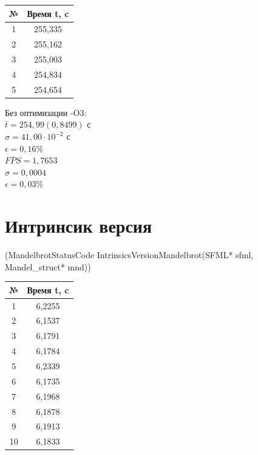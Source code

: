 \documentclass[12pt, letterpaper]{article}
\begin{document}
    \begin{table}
        \begin{tabular}{cc}
        \toprule             %
        \textbf{№} & \textbf{Время t, c} \\
        \midrule             %
        1 & 255,335 \\
        2 & 255,162 \\
        3 & 255,003 \\
        4 & 254,834 \\
        5 & 254,654 \\
        \bottomrule          %
        \end{tabular}
    \end{table}
    Без оптимизации -O3:\\
    $\bar{t} = 254,99 (0,8499)$ с\\
    $\sigma = 41,00 \cdot 10^{-2}$ с\\
    $\epsilon = 0,16\%$\\
    $\bar{FPS} = 1,7653$\\
    $\sigma = 0,0004$\\
    $\epsilon = 0,03\%$\\

    \begin{table}
    \section{Интринсик версия} (MandelbrotStatusCode IntrinsicsVersionMandelbrot(SFML* sfml, Mandel\_struct* mnd))
    \end{table}

    \begin{table}
        \begin{tabular}{cc}
        \toprule             %
        \textbf{№} & \textbf{Время t, c} \\
        \midrule             %
        1 & 6,2255 \\
        2 & 6,1537 \\
        3 & 6,1791 \\
        4 & 6,1784 \\
        5 & 6,2339 \\
        6 & 6,1735 \\
        7 & 6,1968 \\
        8 & 6,1878 \\
        9 & 6,1913 \\
        10 & 6,1833 \\
        \bottomrule          %
        \end{tabular}
    \end{table}
\end{document}
